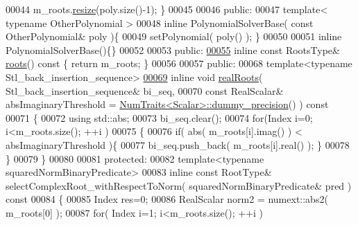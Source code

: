 \begin{DoxyCode}
00044       m\_roots.\hyperlink{class_eigen_1_1_plain_object_base_a99d9054ee2d5a40c6e00ded0265e9cea}{resize}(poly.size()-1); \}
00045 
00046   \textcolor{keyword}{public}:
00047     \textcolor{keyword}{template}< \textcolor{keyword}{typename} OtherPolynomial >
00048     \textcolor{keyword}{inline} PolynomialSolverBase( \textcolor{keyword}{const} OtherPolynomial& poly )\{
00049       setPolynomial( poly() ); \}
00050 
00051     \textcolor{keyword}{inline} PolynomialSolverBase()\{\}
00052 
00053   \textcolor{keyword}{public}:
\hyperlink{class_eigen_1_1_polynomial_solver_base_a07bcd5339be5eacdf7e566d07d81bedb}{00055}     \textcolor{keyword}{inline} \textcolor{keyword}{const} RootsType& \hyperlink{class_eigen_1_1_polynomial_solver_base_a07bcd5339be5eacdf7e566d07d81bedb}{roots}()\textcolor{keyword}{ const }\{ \textcolor{keywordflow}{return} m\_roots; \}
00056 
00057   \textcolor{keyword}{public}:
00068     \textcolor{keyword}{template}<\textcolor{keyword}{typename} Stl\_back\_insertion\_sequence>
\hyperlink{class_eigen_1_1_polynomial_solver_base_a4ea3b29499623832a0ad7b2b3ab05597}{00069}     \textcolor{keyword}{inline} \textcolor{keywordtype}{void} \hyperlink{class_eigen_1_1_polynomial_solver_base_a4ea3b29499623832a0ad7b2b3ab05597}{realRoots}( Stl\_back\_insertion\_sequence& bi\_seq,
00070         \textcolor{keyword}{const} RealScalar& absImaginaryThreshold = 
      \hyperlink{group___core___module_struct_eigen_1_1_num_traits}{NumTraits<Scalar>::dummy\_precision}() )\textcolor{keyword}{ const}
00071 \textcolor{keyword}{    }\{
00072       \textcolor{keyword}{using} std::abs;
00073       bi\_seq.clear();
00074       \textcolor{keywordflow}{for}(Index i=0; i<m\_roots.size(); ++i )
00075       \{
00076         \textcolor{keywordflow}{if}( abs( m\_roots[i].imag() ) < absImaginaryThreshold )\{
00077           bi\_seq.push\_back( m\_roots[i].real() ); \}
00078       \}
00079     \}
00080 
00081   \textcolor{keyword}{protected}:
00082     \textcolor{keyword}{template}<\textcolor{keyword}{typename} squaredNormBinaryPredicate>
00083     \textcolor{keyword}{inline} \textcolor{keyword}{const} RootType& selectComplexRoot\_withRespectToNorm( squaredNormBinaryPredicate& pred )\textcolor{keyword}{ const}
00084 \textcolor{keyword}{    }\{
00085       Index res=0;
00086       RealScalar norm2 = numext::abs2( m\_roots[0] );
00087       \textcolor{keywordflow}{for}( Index i=1; i<m\_roots.size(); ++i )

\end{DoxyCode}
